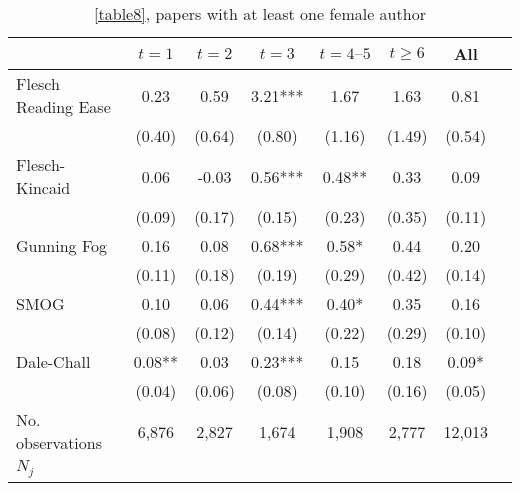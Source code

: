 \begin{table}
    \footnotesize
    \centering
    \begin{threeparttable}
        \caption{\autoref{table8}, papers with at least one female author}
        \label{table8XA}
        \begin{tabular}{p{3cm}S@{}S@{}S@{}S@{}S@{}S@{}S@{}}
            \toprule
            &{\(t=1\)}&{\(t=2\)}&{\(t=3\)}&{\(t=4\text{--}5\)}&{\(t\ge6\)}&{All}\\
            \midrule
            Flesch Reading Ease           &        0.23   &        0.59   &        3.21***&        1.67   &        1.63   &        0.81   \\
                                          &      (0.40)   &      (0.64)   &      (0.80)   &      (1.16)   &      (1.49)   &      (0.54)   \\
            Flesch-Kincaid                &        0.06   &       -0.03   &        0.56***&        0.48** &        0.33   &        0.09   \\
                                          &      (0.09)   &      (0.17)   &      (0.15)   &      (0.23)   &      (0.35)   &      (0.11)   \\
            Gunning Fog                   &        0.16   &        0.08   &        0.68***&        0.58*  &        0.44   &        0.20   \\
                                          &      (0.11)   &      (0.18)   &      (0.19)   &      (0.29)   &      (0.42)   &      (0.14)   \\
            SMOG                          &        0.10   &        0.06   &        0.44***&        0.40*  &        0.35   &        0.16   \\
                                          &      (0.08)   &      (0.12)   &      (0.14)   &      (0.22)   &      (0.29)   &      (0.10)   \\
            Dale-Chall                    &        0.08** &        0.03   &        0.23***&        0.15   &        0.18   &        0.09*  \\
                                          &      (0.04)   &      (0.06)   &      (0.08)   &      (0.10)   &      (0.16)   &      (0.05)   \\
            \midrule
            No. observations              &       6,876   &       2,827   &       1,674   &       1,908   &       2,777   &      12,013   \\
            \(N_j\)                       &           {}   &           {}   &           {}   &           {}   &           {}   &           {}   \\

\end{tabular}
\end{threeparttable}
\end{table}
